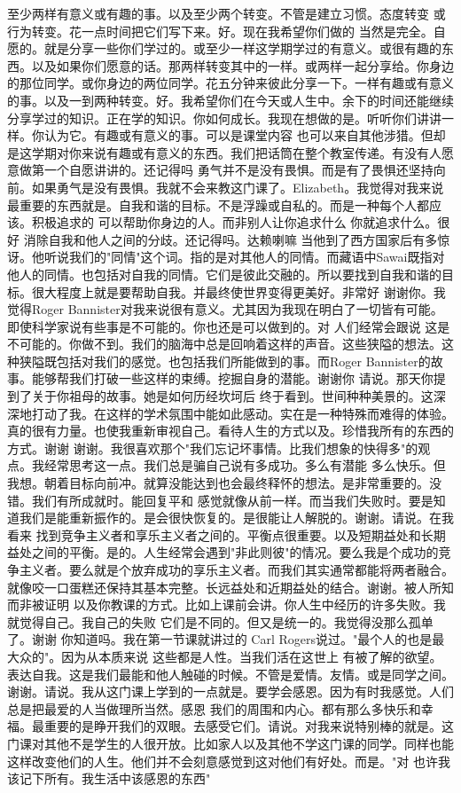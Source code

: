 至少两样有意义或有趣的事。以及至少两个转变。不管是建立习惯。态度转变 或行为转变。花一点时间把它们写下来。好。现在我希望你们做的 当然是完全。自愿的。就是分享一些你们学过的。或至少一样这学期学过的有意义。或很有趣的东西。以及如果你们愿意的话。那两样转变其中的一样。或两样一起分享给。你身边的那位同学。或你身边的两位同学。花五分钟来彼此分享一下。一样有趣或有意义的事。以及一到两种转变。好。我希望你们在今天或人生中。余下的时间还能继续分享学过的知识。正在学的知识。你如何成长。我现在想做的是。听听你们讲讲一样。你认为它。有趣或有意义的事。可以是课堂内容 也可以来自其他涉猎。但却是这学期对你来说有趣或有意义的东西。我们把话筒在整个教室传递。有没有人愿意做第一个自愿讲讲的。还记得吗 勇气并不是没有畏惧。而是有了畏惧还坚持向前。如果勇气是没有畏惧。我就不会来教这门课了。Elizabeth。我觉得对我来说最重要的东西就是。自我和谐的目标。不是浮躁或自私的。而是一种每个人都应该。积极追求的 可以帮助你身边的人。而非别人让你追求什么 你就追求什么。很好 消除自我和他人之间的分歧。还记得吗。达赖喇嘛 当他到了西方国家后有多惊讶。他听说我们的"同情"这个词。指的是对其他人的同情。而藏语中Sawai既指对他人的同情。也包括对自我的同情。它们是彼此交融的。所以要找到自我和谐的目标。很大程度上就是要帮助自我。并最终使世界变得更美好。非常好 谢谢你。我觉得Roger Bannister对我来说很有意义。尤其因为我现在明白了一切皆有可能。即使科学家说有些事是不可能的。你也还是可以做到的。对 人们经常会跟说 这是不可能的。你做不到。我们的脑海中总是回响着这样的声音。这些狭隘的想法。这种狭隘既包括对我们的感觉。也包括我们所能做到的事。而Roger Bannister的故事。能够帮我们打破一些这样的束缚。挖掘自身的潜能。谢谢你 请说。那天你提到了关于你祖母的故事。她是如何历经坎坷后 终于看到。世间种种美景的。这深深地打动了我。在这样的学术氛围中能如此感动。实在是一种特殊而难得的体验。真的很有力量。也使我重新审视自己。看待人生的方式以及。珍惜我所有的东西的方式。谢谢 谢谢。我很喜欢那个"我们忘记坏事情。比我们想象的快得多"的观点。我经常思考这一点。我们总是骗自己说有多成功。多么有潜能 多么快乐。但我想。朝着目标向前冲。就算没能达到也会最终释怀的想法。是非常重要的。没错。我们有所成就时。能回复平和 感觉就像从前一样。而当我们失败时。要是知道我们是能重新振作的。是会很快恢复的。是很能让人解脱的。谢谢。请说。在我看来 找到竞争主义者和享乐主义者之间的。平衡点很重要。以及短期益处和长期益处之间的平衡。是的。人生经常会遇到"非此则彼"的情况。要么我是个成功的竞争主义者。要么就是个放弃成功的享乐主义者。而我们其实通常都能将两者融合。就像咬一口蛋糕还保持其基本完整。长远益处和近期益处的结合。谢谢。被人所知而非被证明 以及你教课的方式。比如上课前会讲。你人生中经历的许多失败。我就觉得自己。我自己的失败 它们是不同的。但又是统一的。我觉得没那么孤单了。谢谢 你知道吗。我在第一节课就讲过的 Carl Rogers说过。"最个人的也是最大众的"。因为从本质来说 这些都是人性。当我们活在这世上 有被了解的欲望。表达自我。这是我们最能和他人触碰的时候。不管是爱情。友情。或是同学之间。谢谢。请说。我从这门课上学到的一点就是。要学会感恩。因为有时我感觉。人们总是把最爱的人当做理所当然。感恩 我们的周围和内心。都有那么多快乐和幸福。最重要的是睁开我们的双眼。去感受它们。请说。对我来说特别棒的就是。这门课对其他不是学生的人很开放。比如家人以及其他不学这门课的同学。同样也能这样改变他们的人生。他们并不会刻意感觉到这对他们有好处。而是。"对 也许我该记下所有。我生活中该感恩的东西" 